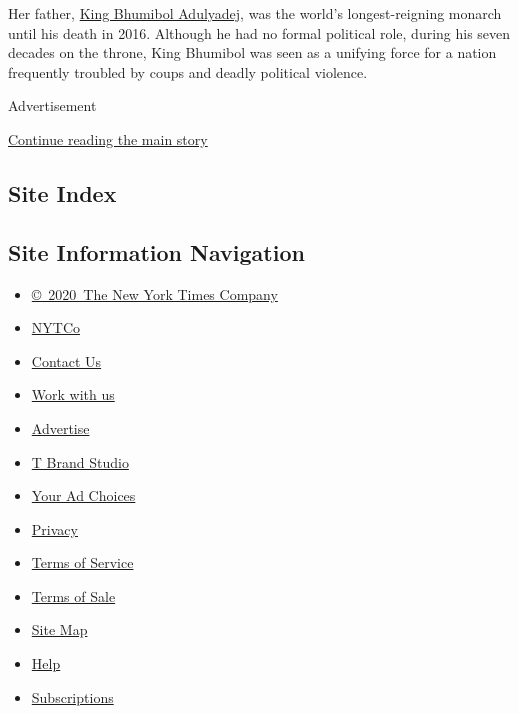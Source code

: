 Her father,
\href{https://www.nytimes3xbfgragh.onion/2016/10/14/world/asia/thai-king-bhumibol-adulyadej-dies.html?module=inline}{King
Bhumibol Adulyadej}, was the world's longest-reigning monarch until his
death in 2016. Although he had no formal political role, during his
seven decades on the throne, King Bhumibol was seen as a unifying force
for a nation frequently troubled by coups and deadly political violence.

Advertisement

\protect\hyperlink{after-bottom}{Continue reading the main story}

\hypertarget{site-index}{%
\subsection{Site Index}\label{site-index}}

\hypertarget{site-information-navigation}{%
\subsection{Site Information
Navigation}\label{site-information-navigation}}

\begin{itemize}
\tightlist
\item
  \href{https://help.nytimes3xbfgragh.onion/hc/en-us/articles/115014792127-Copyright-notice}{©~2020~The
  New York Times Company}
\end{itemize}

\begin{itemize}
\tightlist
\item
  \href{https://www.nytco.com/}{NYTCo}
\item
  \href{https://help.nytimes3xbfgragh.onion/hc/en-us/articles/115015385887-Contact-Us}{Contact
  Us}
\item
  \href{https://www.nytco.com/careers/}{Work with us}
\item
  \href{https://nytmediakit.com/}{Advertise}
\item
  \href{http://www.tbrandstudio.com/}{T Brand Studio}
\item
  \href{https://www.nytimes3xbfgragh.onion/privacy/cookie-policy\#how-do-i-manage-trackers}{Your
  Ad Choices}
\item
  \href{https://www.nytimes3xbfgragh.onion/privacy}{Privacy}
\item
  \href{https://help.nytimes3xbfgragh.onion/hc/en-us/articles/115014893428-Terms-of-service}{Terms
  of Service}
\item
  \href{https://help.nytimes3xbfgragh.onion/hc/en-us/articles/115014893968-Terms-of-sale}{Terms
  of Sale}
\item
  \href{https://spiderbites.nytimes3xbfgragh.onion}{Site Map}
\item
  \href{https://help.nytimes3xbfgragh.onion/hc/en-us}{Help}
\item
  \href{https://www.nytimes3xbfgragh.onion/subscription?campaignId=37WXW}{Subscriptions}
\end{itemize}
